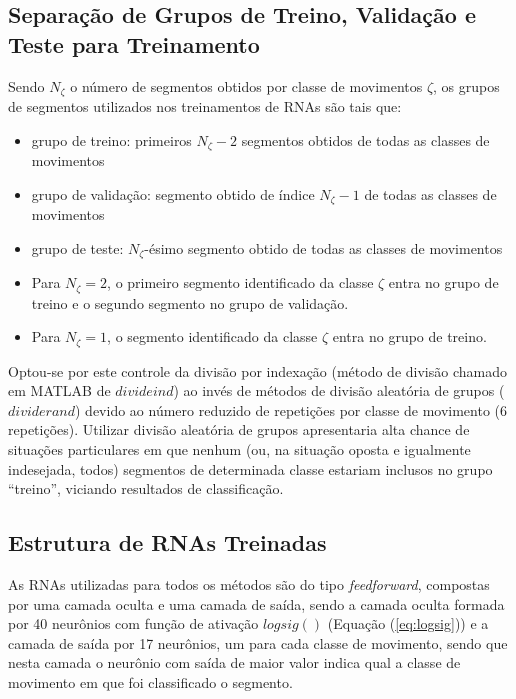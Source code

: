 			\subsection{Separação de Grupos de Treino, Validação e Teste para Treinamento}
Sendo $N_\zeta$ o número de segmentos obtidos por classe de movimentos $\zeta$, os grupos de segmentos utilizados nos treinamentos de RNAs são tais que: 

\begin{itemize}
\item grupo de treino: primeiros $N_\zeta-2$ segmentos obtidos de todas as classes de movimentos
\item grupo de validação: segmento obtido de índice $N_\zeta-1$ de todas as classes de movimentos
\item grupo de teste: $N_\zeta$-ésimo segmento obtido de todas as classes de movimentos
\item Para $N_\zeta=2$, o primeiro segmento identificado da classe $\zeta$ entra no grupo de treino e o segundo segmento no grupo de validação.
\item Para $N_\zeta=1$, o segmento identificado da classe $\zeta$ entra no grupo de treino.
\end{itemize}

Optou-se por este controle da divisão por indexação (método de divisão chamado em MATLAB de $divideind$) ao invés de métodos de divisão aleatória de grupos ($dividerand$) devido ao número reduzido de repetições por classe de movimento (6 repetições). Utilizar divisão aleatória de grupos apresentaria alta chance de situações particulares em que nenhum (ou, na situação oposta e igualmente indesejada, todos) segmentos de determinada classe estariam inclusos no grupo ``treino'', viciando resultados de classificação.

			\subsection{Estrutura de RNAs Treinadas}
As RNAs utilizadas para todos os métodos são do tipo \emph{feedforward}, compostas por uma camada oculta e uma camada de saída, sendo a camada oculta formada por 40 neurônios com função de ativação $logsig()$ (Equação (\ref{eq:logsig})) e a camada de saída por 17 neurônios, um para cada classe de movimento, sendo que nesta camada o neurônio com saída de maior valor indica qual a classe de movimento em que foi classificado o segmento.

